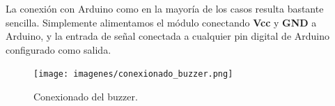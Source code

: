 La conexión con Arduino como en la mayoría de los casos resulta bastante sencilla. Simplemente alimentamos el módulo conectando \textbf{Vcc} y \textbf{GND} a Arduino, y la entrada
de señal conectada a cualquier pin digital de Arduino configurado como salida.\\

 \begin{figure}[H]
  \begin{center}
    \texttt{[image: imagenes/conexionado\_buzzer.png]}
  \end{center}
  \caption{Conexionado del buzzer.}
  \label{figura:pines_sharp}
\end{figure}
